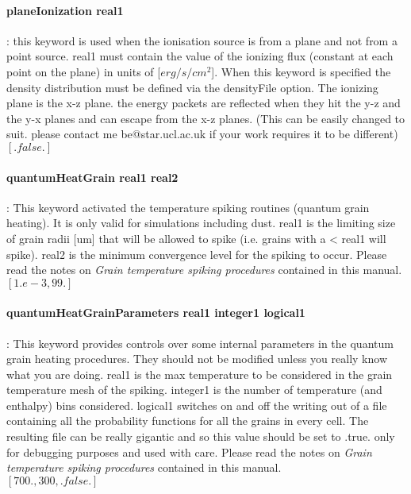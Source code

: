 \documentclass[11pt]{article}
\begin{document}
\paragraph  {  planeIonization real1} : this keyword is used when the ionisation source is from a 
                    plane and not from a point source. real1 must contain the value 
		    of the ionizing flux (constant at each point on the plane) in units of 
		    [$erg/s/cm^2$]. When this keyword is specified the density distribution
		    must be defined via the densityFile option. The ionizing plane is the 
		    x-z plane. the energy packets are reflected when they hit the y-z and
		    the y-x planes and can escape from the x-z planes. (This can be easily 
		    changed to suit. please contact me be@star.ucl.ac.uk if your work requires 
		    it to be different)\\
		    $[.false.]$\\

\paragraph {quantumHeatGrain real1 real2}: This keyword activated the temperature spiking routines (quantum grain heating). It is only valid for simulations including dust. real1 is the limiting size of grain radii [um] that will be allowed to spike (i.e. grains with a < real1 will spike). real2 is the minimum convergence level for the spiking to occur. Please read the notes on {\it Grain temperature spiking procedures} contained in this manual.\\
$[1.e-3, 99.]$\\

\paragraph {quantumHeatGrainParameters real1 integer1 logical1}: This keyword provides controls over some internal parameters in the quantum grain heating procedures. They should not be modified unless you really know what you are doing.  real1 is the max temperature to be considered in the grain temperature mesh of the spiking. integer1  is the number of temperature (and enthalpy) bins considered. logical1 switches on and off the writing out of a file containing all the probability functions for all the grains in every cell. The resulting file can be really gigantic and so this value should be set to .true. only for debugging purposes and used with care. Please read the notes on {\it Grain temperature spiking procedures} contained in this manual.\\
$[700., 300, .false.]$
 
\end{document}
